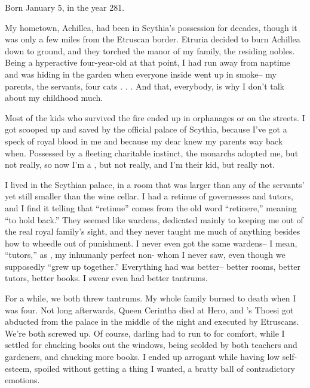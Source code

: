 \documentclass[char]{Kos}
\begin{document}
\name{\cWard{}}

Born January 5, in the year 281.

My hometown, Achillea, had been in Scythia's possession for decades, though it was only a few miles from the Etruscan border. Etruria decided to burn Achillea down to ground, and they torched the manor of my family, the residing nobles. Being a hyperactive four-year-old at that point, I had run away from naptime and was hiding in the garden when everyone inside went up in smoke-- my parents, the servants, four cats . . . And that, everybody, is why I don't talk about my childhood much.

Most of the kids who survived the fire ended up in orphanages or on the streets. I got scooped up and saved by the official palace of Scythia, because I've got a speck of royal blood in me and because my dear \cScythiaQueen{\Monarch} \cScythiaQueen{} knew my parents way back when. Possessed by a fleeting charitable instinct, the monarchs adopted me, but not really, so now I'm a \cWard{\prince}, but not really, and I'm their kid, but really not.

I lived in the Scythian palace, in a room that was larger than any of the servants' yet still smaller than the wine cellar. I had a retinue of governesses and tutors, and I find it telling that ``retinue'' comes from the old word ``retinere,'' meaning ``to hold back.'' They seemed like wardens, dedicated mainly to keeping me out of the real royal family's sight, and they never taught me much of anything besides how to wheedle out of punishment. I never even got the same wardens-- I mean, ``tutors,'' as \cBride{}, my inhumanly perfect non-\cBride{\sibling} \cBride{\sibling} whom I never saw, even though we supposedly ``grew up together.'' Everything \cBride{} had was better-- better rooms, better tutors, better books. I swear \cBride{\they} even had better tantrums.

For a while, we both threw tantrums. My whole family burned to death when I was four. Not long afterwards, Queen Cerintha died at Hero, and \cBride{}'s \cFugitive{\sibling} Thoesi got abducted from the palace in the middle of the night and executed by Etruscans. We're both screwed up. Of course, darling \cBride{} had \cBride{\their} \cScythiaKing{\parent} \cScythiaKing{} to run to for comfort, while I settled for chucking books out the windows, being scolded by both teachers and gardeners, and chucking more books. I ended up arrogant while having low self-esteem, spoiled without getting a thing I wanted, a bratty ball of contradictory emotions. 
\end{document}
